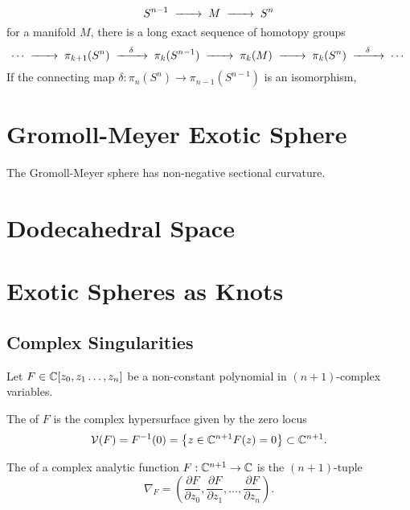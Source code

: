 \[
	S^{n-1} \lkxto M \lkxto S^n
\]
for a manifold $M$, there is a long exact sequence of homotopy groups
\[
	\cdots \lkxto \pi_{k+1}(S^{n}) \lkxto[\delta] \pi_k(S^{n-1}) \lkxto \pi_k(M) \lkxto \pi_{k}(S^{n})\lkxto[\delta] \cdots
\]
If the connecting map $\delta : \pi_{n}(S^n) \to \pi_{n-1}(S^{n-1})$ is an isomorphism,


\begin{definition}
\end{definition}


\section{Gromoll-Meyer Exotic Sphere}

\begin{theorem}
	The Gromoll-Meyer sphere has non-negative sectional curvature.
\end{theorem}

\section{Dodecahedral Space}

\section{Exotic Spheres as Knots}

\subsection{Complex Singularities}

Let $F\in \mathbb{C}[z_0,z_1\ldots, z_n]$ be a non-constant polynomial in $(n+1)$-complex variables.
\begin{definition}
	The  of $F$ is the complex hypersurface given by the zero locus
	\[
		\mathcal{V}(F) = F^{-1}(0)=\left\{ z \in \mathbb{C}^{n+1}  F(z)=0\right\} \subset \mathbb{C}^{n+1}.
	\]
\end{definition}


\begin{definition}
	The  of a complex analytic function $F : \mathbb{C}^{n+1} \to \mathbb{C}$ is the $(n+1)$-tuple
	\[
		\nabla_F = \left(\frac{\partial F}{\partial z_0}, \frac{\partial F}{\partial z_1},\ldots, \frac{\partial F}{\partial z_n}\right).
	\]
\end{definition}

